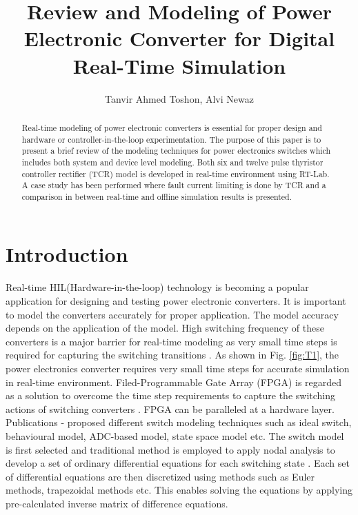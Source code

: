 \documentclass[journal]{IEEEtran}
\begin{document}
\title{Review and Modeling of Power Electronic Converter for Digital Real-Time Simulation}

\author{Tanvir Ahmed Toshon, Alvi Newaz}






\maketitle


\begin{abstract}
Real-time modeling of power electronic converters is essential for proper design and hardware or controller-in-the-loop experimentation. The purpose of this paper is to present a brief review of the modeling techniques for power electronics switches which includes both system and device level modeling. Both six and twelve pulse thyristor controller rectifier (TCR) model is developed in real-time environment using RT-Lab. A case study has been performed where fault current limiting is done by TCR and a comparison in between real-time and offline simulation results is presented. 

\end{abstract}



\IEEEpeerreviewmaketitle



\section{Introduction}

Real-time HIL(Hardware-in-the-loop) technology is becoming a popular application for designing and testing power electronic converters. It is important to model the converters accurately for proper application. The model accuracy depends on the application of the model. High switching frequency of these converters is a major barrier for real-time modeling as very small time steps is required for capturing the switching transitions \cite{faruque2015real}. As shown in Fig. \ref{fig:T1}, the power electronics converter requires very small time steps for accurate simulation in real-time environment. Filed-Programmable Gate Array (FPGA) is regarded as a solution to overcome the time step requirements to capture the switching actions of switching converters  \cite{faruque2015real}. FPGA can be paralleled at a hardware layer. Publications \cite{matar2010fpga}-\cite{myaing2011fpga} proposed different switch modeling techniques such as ideal switch, behavioural model, ADC-based model, state space model etc. The switch model is first selected and traditional method is employed to apply nodal analysis to develop a set of ordinary differential equations for each switching state \cite{matar2010fpga}. Each set of differential equations are then discretized using methods such as Euler methods, trapezoidal methods etc. This enables solving the equations by applying pre-calculated inverse matrix of difference equations.
\end{document}

